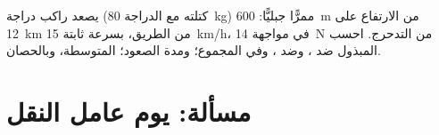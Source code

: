 \begin{exercise}[$\star\star\star$]\label{exo:g11:work-of-force:15}
يصعد راكب دراجة (كتلته مع الدراجة \qty{80}{kg}) ممرًّا جبليًّا: \qty{600}{m} من
الارتفاع على \qty{12}{km} من الطريق، بسرعة ثابتة \qty{15}{km/h}،
في مواجهة \qty{14}{N} من   التدحرج. احسب 
المبذول ضد ، وضد ، وفي المجموع؛ ومدة
الصعود؛  المتوسطة،  وبالحصان.
\end{exercise}

\section{مسألة: يوم عامل النقل}

